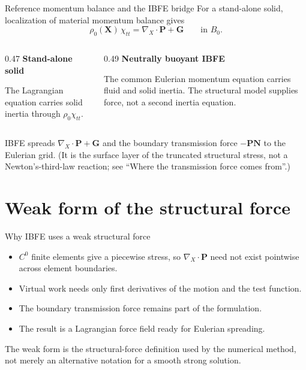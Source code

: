 \documentclass[aspectratio=169,11pt]{beamer}
\newcommand{\Xvec}{\bm{X}}
\newcommand{\Gvec}{\bm{G}}
\newcommand{\Nvec}{\bm{N}}
\newcommand{\Pten}{\bm{P}}
\newcommand{\Div}{\nabla_{\!X}\!\cdot}
\begin{document}
\begin{frame}{Reference momentum balance and the IBFE bridge}
For a stand-alone solid, localization of material momentum balance gives
\[
  \rho_0(\Xvec)\,\chi_{tt}
  =\Div\Pten+\Gvec
  \qquad\text{in }B_0.
\]
\begin{columns}[T,onlytextwidth]
\begin{column}{0.47\textwidth}
\textbf{Stand-alone solid}

The Lagrangian equation carries solid inertia through \(\rho_0\chi_{tt}\).
\end{column}
\begin{column}{0.49\textwidth}
\textbf{Neutrally buoyant IBFE}

The common Eulerian momentum equation carries fluid and solid inertia. The structural model supplies force, not a second inertia equation.
\end{column}
\end{columns}
\medskip
\begin{punchbox}
\small IBFE spreads \(\Div\Pten+\Gvec\) and the boundary transmission force \(-\Pten\Nvec\) to the Eulerian grid. (It is the surface layer of the truncated structural stress, not a Newton's-third-law reaction; see ``Where the transmission force comes from''.)
\end{punchbox}
\end{frame}

\section{Weak form of the structural force}

\begin{frame}{Why IBFE uses a weak structural force}
\begin{itemize}\itemsep8pt
  \item \(C^0\) finite elements give a piecewise stress, so \(\Div\Pten\) need not exist pointwise across element boundaries.
  \item Virtual work needs only first derivatives of the motion and the test function.
  \item The boundary transmission force remains part of the formulation.
  \item The result is a Lagrangian force field ready for Eulerian spreading.
\end{itemize}
\medskip
\begin{punchbox}
\small The weak form is the structural-force definition used by the numerical method, not merely an alternative notation for a smooth strong solution.
\end{punchbox}
\end{frame}
\end{document}
